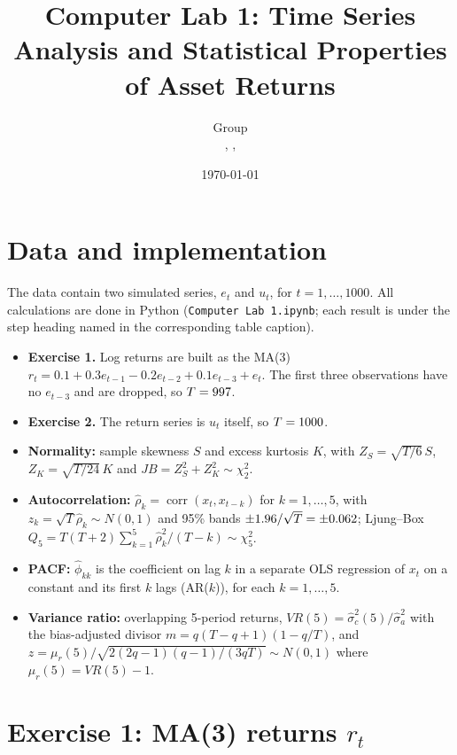 \documentclass[11pt,a4paper]{article}
\title{Computer Lab 1: Time Series Analysis and Statistical Properties of Asset Returns}
\author{Group \todo{number} \\ \small \todo{Name 1}, \todo{Name 2}, \todo{Name 3}}
\date{\today}
\begin{document}
\maketitle

\section{Data and implementation}
The data contain two simulated series, $e_t$ and $u_t$, for $t=1,\dots,1000$.
All calculations are done in Python (\texttt{Computer Lab 1.ipynb}; each result is under the
step heading named in the corresponding table caption).

\begin{itemize}
  \item \textbf{Exercise 1.} Log returns are built as the MA(3)
        $r_t = 0.1 + 0.3e_{t-1} - 0.2e_{t-2} + 0.1e_{t-3} + e_t$.
        The first three observations have no $e_{t-3}$ and are dropped, so $T=997$.
  \item \textbf{Exercise 2.} The return series is $u_t$ itself, so $T=1000$.
  \item \textbf{Normality:} sample skewness $S$ and excess kurtosis $K$, with
        $Z_S=\sqrt{T/6}\,S$, $Z_K=\sqrt{T/24}\,K$ and $JB=Z_S^2+Z_K^2\sim\chi^2_2$.
  \item \textbf{Autocorrelation:} $\hat\rho_k=\operatorname{corr}(x_t,x_{t-k})$ for $k=1,\dots,5$, with
        $z_k=\sqrt{T}\hat\rho_k\sim N(0,1)$ and 95\% bands $\pm 1.96/\sqrt{T}=\pm0.062$;
        Ljung--Box $Q_5=T(T+2)\sum_{k=1}^{5}\hat\rho_k^2/(T-k)\sim\chi^2_5$.
  \item \textbf{PACF:} $\hat\phi_{kk}$ is the coefficient on lag $k$ in a separate OLS regression of
        $x_t$ on a constant and its first $k$ lags (AR($k$)), for each $k=1,\dots,5$.
  \item \textbf{Variance ratio:} overlapping 5-period returns, $VR(5)=\hat\sigma_c^2(5)/\hat\sigma_a^2$ with the
        bias-adjusted divisor $m=q(T-q+1)(1-q/T)$, and
        $z=\mu_r(5)\big/\sqrt{2(2q-1)(q-1)/(3qT)}\sim N(0,1)$ where $\mu_r(5)=VR(5)-1$.
\end{itemize}

\section{Exercise 1: MA(3) returns $r_t$}
\end{document}
